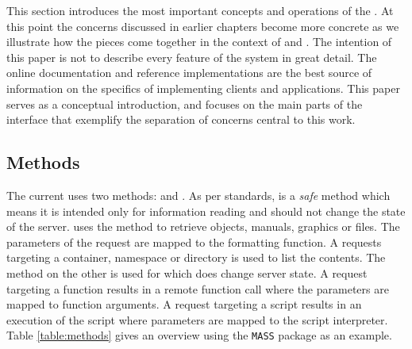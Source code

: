This section introduces the most important concepts and operations of the \API. At this point the concerns discussed in earlier chapters become more concrete as we illustrate how the pieces come together in the context of \R and \HTTP. The intention of this paper is not to describe every feature of the system in great detail. The online documentation and reference implementations are the best source of information on the specifics of implementing clients and applications. This paper serves as a conceptual introduction, and focuses on the main parts of the interface that exemplify the separation of concerns central to this work. 



\subsection{Methods}

The current \API uses two \HTTP methods: \GET and \POST. As per \HTTP standards, \GET is a \emph{safe} method which means it is intended only for information reading and should not change the state of the server. \OpenCPU uses the \GET method to retrieve objects, manuals, graphics or files. The parameters of the request are mapped to the formatting function. A \GET requests targeting a container, namespace or directory is used to list the contents. The \POST method on the other is used for \RPC which does change server state. A \POST request targeting a function results in a remote function call where the \HTTP parameters are mapped to function arguments. A \POST request targeting a script results in an execution of the script where \HTTP parameters are mapped to the script interpreter. Table \ref{table:methods} gives an overview using the \texttt{MASS} package \citep{MASS} as an example.

